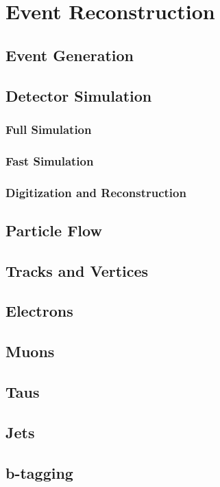 \chapter{Event Reconstruction
\label{ch:reconstruction}}

\section{Event Generation}

\section{Detector Simulation}

\subsection{Full Simulation}

\subsection{Fast Simulation}

\subsection{Digitization and Reconstruction}

\section{Particle Flow}

\section{Tracks and Vertices}

\section{Electrons}

\section{Muons}

\section{Taus}

\section{Jets}

\section{b-tagging}